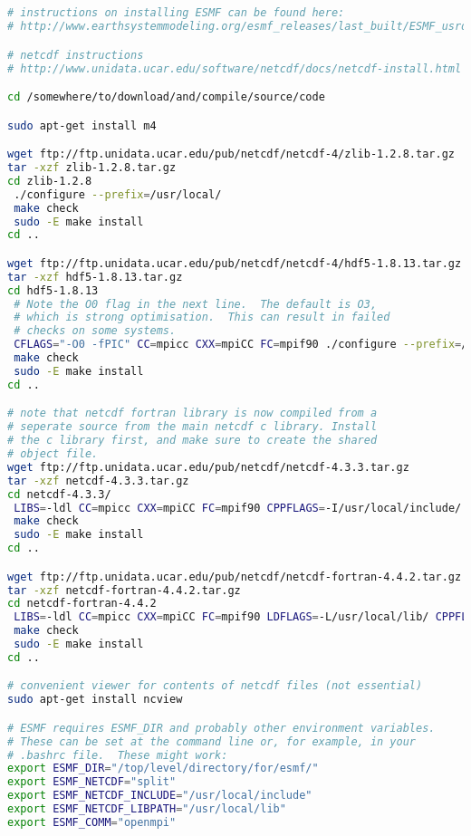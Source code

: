 \documentclass[12pt]{article}
\begin{document}
\begin{lstlisting}[language=bash]


# instructions on installing ESMF can be found here:
# http://www.earthsystemmodeling.org/esmf_releases/last_built/ESMF_usrdoc/node9.html

# netcdf instructions
# http://www.unidata.ucar.edu/software/netcdf/docs/netcdf-install.html

cd /somewhere/to/download/and/compile/source/code

sudo apt-get install m4

wget ftp://ftp.unidata.ucar.edu/pub/netcdf/netcdf-4/zlib-1.2.8.tar.gz
tar -xzf zlib-1.2.8.tar.gz 
cd zlib-1.2.8
 ./configure --prefix=/usr/local/
 make check
 sudo -E make install
cd ..

wget ftp://ftp.unidata.ucar.edu/pub/netcdf/netcdf-4/hdf5-1.8.13.tar.gz	
tar -xzf hdf5-1.8.13.tar.gz 
cd hdf5-1.8.13
 # Note the O0 flag in the next line.  The default is O3, 
 # which is strong optimisation.  This can result in failed 
 # checks on some systems.
 CFLAGS="-O0 -fPIC" CC=mpicc CXX=mpiCC FC=mpif90 ./configure --prefix=/usr/local/ --with-zlib=/usr/local  --enable-fortran --enable-parallel --enable-shared
 make check
 sudo -E make install
cd ..

# note that netcdf fortran library is now compiled from a 
# seperate source from the main netcdf c library. Install 
# the c library first, and make sure to create the shared
# object file. 
wget ftp://ftp.unidata.ucar.edu/pub/netcdf/netcdf-4.3.3.tar.gz
tar -xzf netcdf-4.3.3.tar.gz 
cd netcdf-4.3.3/
 LIBS=-ldl CC=mpicc CXX=mpiCC FC=mpif90 CPPFLAGS=-I/usr/local/include/ LDFLAGS=-L/usr/local/lib/  ./configure --prefix=/usr/local --enable-parallel 
 make check
 sudo -E make install
cd ..

wget ftp://ftp.unidata.ucar.edu/pub/netcdf/netcdf-fortran-4.4.2.tar.gz
tar -xzf netcdf-fortran-4.4.2.tar.gz 
cd netcdf-fortran-4.4.2
 LIBS=-ldl CC=mpicc CXX=mpiCC FC=mpif90 LDFLAGS=-L/usr/local/lib/ CPPFLAGS="-I/usr/local/include -DUSE_NETCDF4"  ./configure --prefix=/usr/local
 make check
 sudo -E make install
cd ..

# convenient viewer for contents of netcdf files (not essential)
sudo apt-get install ncview

# ESMF requires ESMF_DIR and probably other environment variables.  
# These can be set at the command line or, for example, in your 
# .bashrc file.  These might work:
export ESMF_DIR="/top/level/directory/for/esmf/"
export ESMF_NETCDF="split"
export ESMF_NETCDF_INCLUDE="/usr/local/include"
export ESMF_NETCDF_LIBPATH="/usr/local/lib"
export ESMF_COMM="openmpi"
                                                                                                              

\end{lstlisting}
\end{document}
